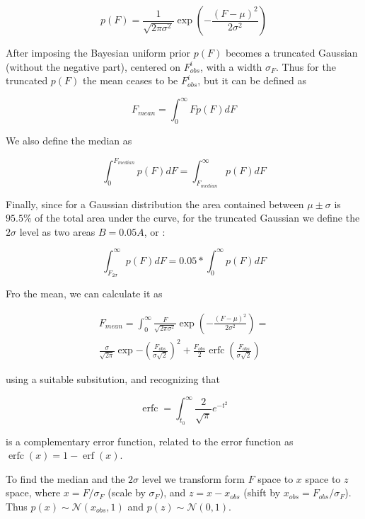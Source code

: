 \documentclass[fleqn,usenatbib]{mnras}  %
\DeclareMathOperator\erfc{erfc}
\DeclareMathOperator\erf{erf}
\begin{document}
\begin{equation}
p(F) = \frac{1}{\sqrt{2  \pi \sigma^{2}}} \exp{ \left(-\frac{(F-\mu)^{2}}{2\sigma^{2}}\right)}
\end{equation}

 After imposing the Bayesian uniform prior $p(F)$ becomes a truncated Gaussian (without the negative part), centered on $F_{obs}^{i}$, with a width $\sigma_F$. Thus for the truncated $p(F)$  the mean ceases to be $F_{obs}^{i}$, but it can be defined as 

\begin{equation}
F_{mean} = \int _{0} ^ {\infty} {F p(F) dF}
\end{equation} 

We also define the median as  

\begin{equation}
\int _{0} ^ {F_{median}} {p(F) dF} = \int _{F_{median}} ^ {\infty} {p(F) dF}
\end{equation} 

Finally, since for a Gaussian distribution the area contained between $\mu \pm \sigma$ is $95.5 \%$ of the total area under the curve, for the truncated Gaussian we define the  $2 \sigma$ level as  two areas  $B = 0.05 A$, or : 

\begin{equation}
\int _{F_{2 \sigma}} ^{\infty} {p(F)dF} = 0.05 * \int _{0} ^{\infty} {p(F) dF} 
\end{equation}

Fro the mean,  we can calculate it as 


\begin{multline}
F_{mean} = \int _{0} ^ {\infty} {\frac{F}{\sqrt{2\pi\sigma^{2}}} \exp{\left(-\frac{(F-\mu)^{2}}{2\sigma^{2}}\right)} } = \\  \frac{\sigma}{\sqrt{2 \pi}} \exp{-\left( \frac{F_{obs}}{\sigma\sqrt{2}} \right) ^{2}} + \frac{F_{obs}}{2} \erfc{\left( \frac{F_{obs}}{\sigma\sqrt{2}}\right)}
\end{multline}

using a suitable subsitution, and recognizing that

\begin{equation}
\erfc = \int_{t_{0}}^{\infty}{\frac{2}{\sqrt{\pi}} e^{-t^2}}
\end{equation}

is a complementary error function, related to the error function as $\erfc(x) = 1-\erf(x)$.
 
To find the median and the $2\sigma$ level we transform form $F$ space to $x$ space to $z$ space, where $x = F / \sigma_{F}$ (scale by $\sigma_{F}$), and $z = x - x_{obs}$  (shift by $x_{obs} = F_{obs} / \sigma_{F}$).  Thus $p(x) \sim \mathcal{N}(x_{obs},1)$ and  $p(z) \sim \mathcal{N}(0,1)$.
\end{document}
